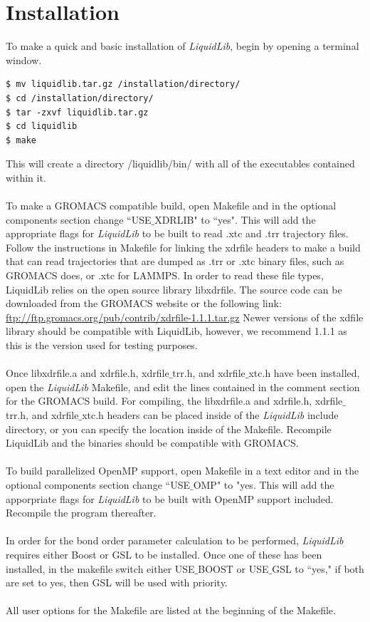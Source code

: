 \documentclass{article}
\begin{document}
\section{Installation}
To make a quick and basic installation of \textit{LiquidLib}, begin by opening a terminal window.
\begin{lstlisting}[style=BashInputStyle]
$ mv liquidlib.tar.gz /installation/directory/
$ cd /installation/directory/
$ tar -zxvf liquidlib.tar.gz
$ cd liquidlib
$ make
\end{lstlisting}
This will create a directory /liquidlib/bin/ with all of the executables contained within it.
\\
\\
To make a GROMACS compatible build, open Makefile and in the optional components section change ``USE$\_$XDRLIB" to ``yes".  This will add the appropriate flags for \textit{LiquidLib} to be built to read .xtc and .trr trajectory files.  Follow the instructions in Makefile for linking the xdrfile headers to make a build that can read trajectories that are dumped as .trr or .xtc binary files, such as GROMACS does, or .xtc for LAMMPS.  In order to read these file types, LiquidLib relies on the open source library libxdrfile.  The source code can be downloaded from the GROMACS website or the following link: \url{ftp://ftp.gromacs.org/pub/contrib/xdrfile-1.1.1.tar.gz} Newer versions of the xdfile library should be compatible with LiquidLib, however, we recommend 1.1.1 as this is the version used for testing purposes.
\\
\\
Once libxdrfile.a and xdrfile.h, xdrfile$\_$trr.h, and xdrfile$\_$xtc.h have been installed, open the \textit{LiquidLib} Makefile, and edit the lines contained in the comment section for the GROMACS build.  For compiling, the libxdrfile.a and xdrfile.h, xdrfile$\_$trr.h, and xdrfile$\_$xtc.h headers can be placed inside of the \textit{LiquidLib} include directory, or you can specify the location inside of the Makefile.  Recompile LiquidLib and the binaries should be compatible with GROMACS.
\\
\\
To build parallelized OpenMP support, open Makefile in a text editor and in the optional components section change ``USE$\_$OMP" to "yes.  This will add the apporpriate flags for \textit{LiquidLib} to be built with OpenMP support included.  Recompile the program thereafter.
\\
\\
In order for the bond order parameter calculation to be performed, \textit{LiquidLib} requires either Boost or GSL to be installed.  Once one of these has been installed, in the makefile switch either USE$\_$BOOST or USE$\_$GSL to ``yes," if both are set to yes, then GSL will be used with priority.
\\
\\
All user options for the Makefile are listed at the beginning of the Makefile.
\end{document}
